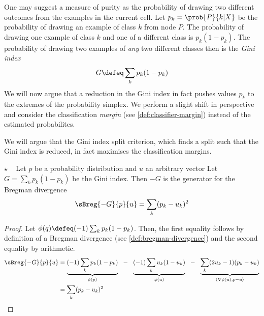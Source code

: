 \documentclass[../main.tex]{subfiles}
\begin{document}
One may suggest a measure of purity as the probability of drawing two different outcomes from the examples in the current cell. 
Let $p_{k} = \prob{P}{k|X}$ be the probability of drawing an example of class $k$ from node $P$.
The probability of drawing one example of class $k$ and one of a different class is $p_{k}(1-p_{k})$.
The probability of drawing two examples of \textit{any} two different classes then is the \textit{Gini index}
$$
G \defeq \sum_{k}p_{k}(1-p_{k})
$$
We will now argue that a reduction in the Gini index in fact pushes values $p_{k}$ to the extremes of the probability simplex. 
We perform a slight shift in perspective and consider the classification \textit{margin} (see \ref{def:classifier-margin}) instead of the estimated probabilites. 



We will argue that the Gini index split criterion, which finds a split such that the Gini index is reduced, in fact maximises the classification margins.

\begin{lemma} $\star$ ~ Let $p$ be a probability distribution and $u$ an arbitrary vector
    Let $G =\sum_{k} p_{k}(1-p_{k})$ be the Gini index. Then $-G$ is the generator for the Bregman divergence
$$
\sBreg{-G}{p}{u} = \sum_{k}(p_{k}-u_{k})^2
$$
\end{lemma}
\begin{proof}
Let $\phi(q) \defeq (-1) \sum_{k} p_{k}(1-p_{k})$. Then, the first equality follows by definition of a Bregman divergence (see \ref{def:bregman-divergence}) and the second equality by arithmetic.
\begin{align*}
\sBreg{-G}{p}{u} &=  
\underbrace{(-1) \sum_{k} p_{k}(1-p_{k})}_{\phi(p)} 
 ~ ~ - ~ ~  
\underbrace{(-1) \sum_{k} u_{k}(1-u_{k})}_{\phi(u)}  
~ ~ - ~ ~  
\underbrace{\sum_{k} (2u_{k}-1)(p_{k}-u_{k})}_{\langle \nabla \phi(u), p-u \rangle} \\  
 &= \sum_{k} (p_{k}-u_{k})^2
\end{align*}
\end{proof}
\end{document}
